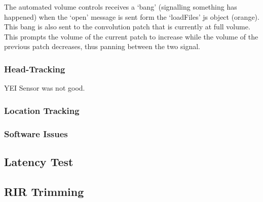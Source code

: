 \documentclass[../../main.tex]{subfiles}
\begin{document}
		 	The automated volume controls receives a `bang' (signalling something has happened) when the `open' message is sent form the `loadFiles' js object (orange). This bang is also sent to the convolution patch that is currently at full volume. This prompts the volume of the current patch to increase while the volume of the previous patch decreases, thus panning between the two signal.

	\subsubsection{Head-Tracking}
		YEI Sensor was not good.

	\subsubsection{Location Tracking}
	\label{locationtracking}

	\subsubsection{Software Issues}
	\label{iteration3Issues}

	\subsection{Latency Test}
	
	\subsection{RIR Trimming}
\end{document}
